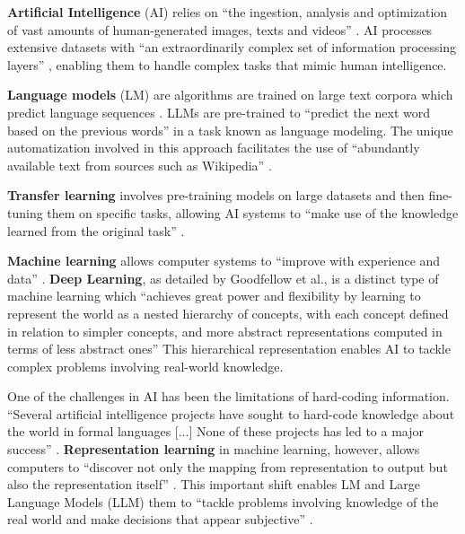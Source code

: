 \textbf{Artificial Intelligence} (AI) relies on “the ingestion, analysis and optimization of vast amounts of human-generated images, texts and videos” \citep{crawford_anatomy_2018}. AI processes extensive datasets with “an extraordinarily complex set of information processing layers” \citep{crawford_anatomy_2018}, enabling them to handle complex tasks that mimic human intelligence. 

\textbf{Language models} (LM) are algorithms are trained on large text corpora which predict language sequences \citep{tunstall_natural_2022}. LLMs are pre-trained to “predict the next word based on the previous words” in a task known as language modeling. The unique automatization involved in this approach facilitates the use of “abundantly available text from sources such as Wikipedia” \citep{tunstall_natural_2022}. 

\textbf{Transfer learning} involves pre-training models on large datasets and then fine-tuning them on specific tasks, allowing AI systems to “make use of the knowledge learned from the original task” \citep{tunstall_natural_2022}. 

\textbf{Machine learning} allows computer systems to “improve with experience and data” \citep[p. 2]{goodfellow_deep_2016}. \textbf{Deep Learning}, as detailed by Goodfellow et al., is a distinct type of machine learning which “achieves great power and flexibility by learning to represent the world as a nested hierarchy of concepts, with each concept defined in relation to simpler concepts, and more abstract representations computed in terms of less abstract ones” \citep[p. 8]{goodfellow_deep_2016}  This hierarchical representation enables AI to tackle complex problems involving real-world knowledge. 

One of the challenges in AI has been the limitations of hard-coding information. “Several artificial intelligence projects have sought to hard-code knowledge about the world in formal languages [...] None of these projects has led to a major success” \citep[p. 2]{goodfellow_deep_2016}. \textbf{Representation learning} in machine learning, however, allows computers to “discover not only the mapping from representation to output but also the representation itself” \citep[p. 4]{goodfellow_deep_2016}. This important shift enables LM and Large Language Models (LLM) them to “tackle problems involving knowledge of the real world and make decisions that appear subjective” \citep[p. 3]{goodfellow_deep_2016}.
 


